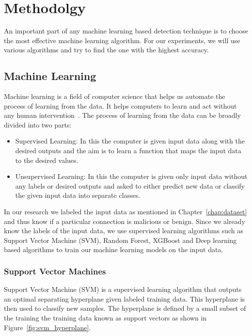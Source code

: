 \chapter{Methodolgy\label{chap:method}}

An important part of any machine learning based detection technique is to choose the most effective machine learning algorithm. For our experiments, we will use various algorithms and try to find the one with the highest accuracy.

\section{Machine Learning}

Machine learning is a field of computer science that helps us automate the process of learning from the data. It helps computers to learn and act without any human intervention~\cite{ML}. The process of learning from the data can be broadly divided into two parts:
\begin{itemize}
	\item Supervised Learning:
	In this the computer is given input data along with the desired outputs and the aim is to learn a function that maps the input data to the desired values.
	\item Unsupervised Learning:
	In this the computer is given only input data without any labels or desired outputs and asked to either predict new data or classify the given input data into separate classes.
\end{itemize}

In our research we labeled the input data as mentioned in Chapter~\ref{chap:dataset} and thus know if a particular connection is malicious or benign. Since we already know the labels of the input data, we use supervised learning algorithms such as Support Vector Machine (SVM), Random Forest, XGBoost and Deep learning based algorithms to train our machine learning models on the input data.

\subsection{Support Vector Machines}

Support Vector Machine (SVM) is a supervised learning algorithm that outputs an optimal separating hyperplane given labeled training data. This hyperplane is then used to classify new samples. The hyperplane is defined by a small subset of the training the training data known as support vectors as shown in Figure~\ref{fig:svm_hyperplane}.


